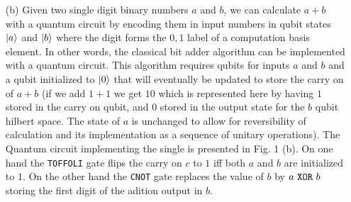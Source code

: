 \documentclass[10pt, a4paper]{article}
\begin{document}
{\begin{enumerate}
  \item[(b)] Given two single digit binary numbers $a$ and $b$, we can calculate $a+b$ with a quantum circuit by encoding them in input numbers in qubit states $\ket{a}$ and $\ket{b}$ where the digit forms the $0, 1$ label of a computation basis element. In other words, the classical bit adder algorithm can be implemented with a quantum circuit. This algorithm requires qubits for inputs $a$ and $b$ and a qubit initialized to $\ket{0}$ that will eventually be updated to store the carry on of $a+b$ (if we add $1 + 1$ we get $10$ which is represented here by having $1$ stored in the carry on qubit, and $0$ stored in the output state for the $b$ qubit hilbert space. The state of $a$ is unchanged to allow for reversibility of calculation and its implementation as a sequence of unitary operations).  The Quantum circuit implementing the single is presented in Fig. 1 (b). On one hand the \verb|TOFFOLI| gate flips the carry on $c$ to $1$ iff both $a$ and $b$ are initialized to $1$. On the other hand the \verb|CNOT| gate replaces the value of $b$ by $a \ \verb|XOR|\ b$ storing the first digit of the adition output in $b$. 


\end{enumerate}}
\end{document}
